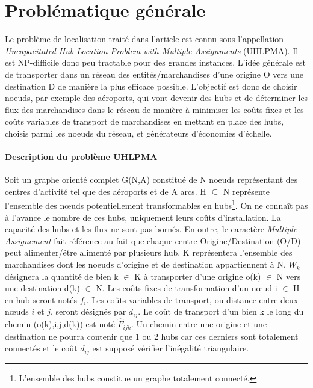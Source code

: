 \section{Problématique générale}

Le problème de localisation traité dans l'article est connu sous l'appellation \textit{Uncapacitated Hub Location Problem with Multiple Assignments} (UHLPMA). Il est NP-difficile donc peu tractable pour des grandes instances. L'idée générale est de transporter dans un réseau des entités/marchandises d'une origine O vers une destination D de manière la plus efficace possible. L'objectif est donc de choisir noeuds, par exemple des aéroports, qui vont devenir des hubs et de déterminer les flux des marchandises dans le réseau de manière à minimiser les coûts fixes et les coûts variables de transport de marchandises en mettant en place des hubs, choisis parmi les noeuds du réseau, et générateurs d'économies d'échelle. 

\paragraph{Description du problème UHLPMA}
Soit un graphe orienté complet G(N,A) constitué de N noeuds représentant des centres d'activité tel que des aéroports et de A arcs. H $\subseteq $ N représente l'ensemble des n\oe uds potentiellement transformables en hubs\footnote{L'ensemble des hubs constitue un graphe totalement connecté.}. On ne connaît pas à l'avance le nombre de ces hubs, uniquement leurs coûts d'installation. La capacité des hubs et les flux ne sont pas bornés. En outre, le caractère \textit{Multiple Assignement} fait référence au fait que chaque centre Origine/Destination (O/D) peut alimenter/être alimenté par plusieurs hub.
K représentera l'ensemble des marchandises dont les noeuds d'origine et de destination
appartiennent à N. $ W_k $ désignera la quantité de bien k $\in$ K  à transporter d'une origine o(k) $\in$ N vers une destination d(k) $\in$ N. Les coûts fixes de transformation d'un n\oe ud i $\in$ H en hub seront notés $ f_i$. Les coûts variables de transport, ou distance entre deux n\oe uds $i$ et $j$, seront désignés par $d_{ij}$. Le coût de transport d'un bien k le long du chemin (o(k),i,j,d(k)) est noté $ \hat{F}_{ijk}$. Un chemin entre une origine et une destination ne pourra contenir que 1 ou 2 hubs car ces derniers sont totalement connectés et le coût $d_{ij}$ est supposé vérifier l'inégalité triangulaire. 




